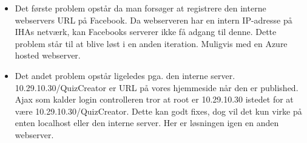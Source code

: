 \begin{itemize}
	\item Det første problem opstår da man forsøger at registrere den interne webservers URL på Facebook. Da webserveren har en intern IP-adresse på IHAs netværk, kan Facebooks serverer ikke få adgang til denne. Dette problem står til at blive løst i en anden iteration. Muligvis med en Azure hosted webserver.
	\item Det andet problem opstår ligeledes pga. den interne server. 10.29.10.30/QuizCreator er URL på vores hjemmeside når den er published. Ajax som kalder login controlleren tror at root er 10.29.10.30 istedet for at være 10.29.10.30/QuizCreator. Dette kan godt fixes, dog vil det kun virke på enten localhost eller den interne server. Her er løsningen igen en anden webserver.
\end{itemize}